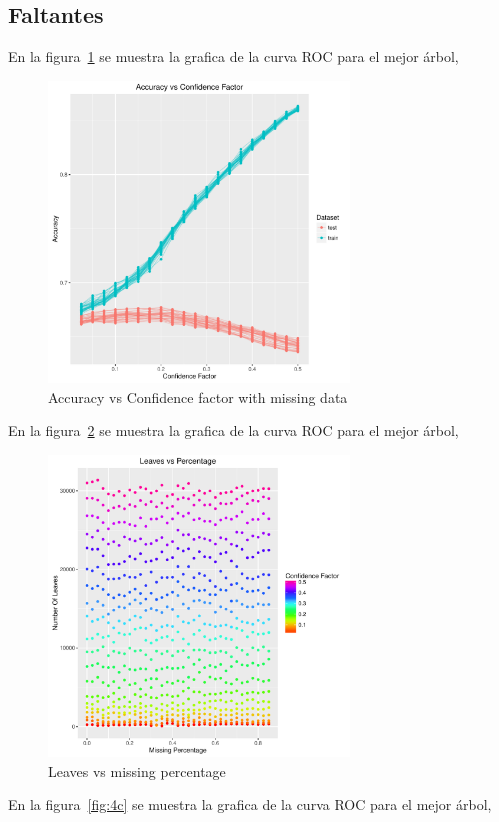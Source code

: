 \subsection{Faltantes}

En la figura~\ref{fig:4a} se muestra la grafica de la curva ROC para el mejor árbol,

\begin{figure}
  \centering
  \includegraphics[width = 8cm]{4a.pdf}
  \caption{Accuracy vs Confidence factor with missing data}
  \label{fig:4a}
\end{figure}

En la figura~\ref{fig:4b} se muestra la grafica de la curva ROC para el mejor árbol,

\begin{figure}
  \centering
  \includegraphics[width = 8cm]{4b.pdf}
  \caption{Leaves vs missing percentage}
  \label{fig:4b}
\end{figure}

En la figura~\ref{fig:4c} se muestra la grafica de la curva ROC para el mejor árbol,

